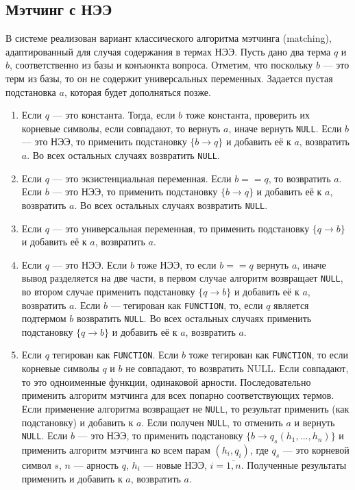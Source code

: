 \subsection{Мэтчинг с НЭЭ}

В системе реализован вариант классического алгоритма мэтчинга (matching), адаптированный для случая содержания в термах НЭЭ. Пусть дано два терма $q$ и $b$, соответственно из базы и конъюнкта вопроса. Отметим, что поскольку $b$ --- это терм из базы, то он не содержит универсальных переменных. Задается пустая подстановка $a$, которая будет дополняться позже.
\begin{enumerate}
\item Если $q$ --- это константа. Тогда, если $b$ тоже константа, проверить их корневые символы, если совпадают, то вернуть $a$, иначе вернуть \texttt{NULL}. Если $b$ --- это НЭЭ, то применить подстановку $\{b \rightarrow q\}$ и добавить её к $a$, возвратить $a$. Во всех остальных случаях возвратить \texttt{NULL}.

\item Если $q$ --- это экзистенциальная переменная. Если $b==q$, то возвратить $a$. Если $b$ --- это НЭЭ, то применить подстановку $\{b \rightarrow q\}$ и добавить её к $a$, возвратить $a$. Во всех остальных случаях возвратить \texttt{NULL}.

\item Если $q$ --- это универсальная переменная, то применить подстановку $\{q \rightarrow b\}$ и добавить её к $a$, возвратить $a$.

\item Если $q$ --- это НЭЭ. Если $b$ тоже НЭЭ, то если $b==q$ вернуть $a$, иначе вывод разделяется на две части, в первом случае алгоритм возвращает \texttt{NULL}, во втором случае применить подстановку $\{q \rightarrow b\}$ и добавить её к $a$, возвратить $a$. Если $b$ --- тегирован как \texttt{FUNCTION}, то, если $q$ является подтермом $b$ возвратить \texttt{NULL}. Во всех остальных случаях применить подстановку $\{q \rightarrow b\}$ и добавить её к $a$, возвратить $a$.

\item Если $q$ тегирован как \texttt{FUNCTION}. Если $b$ тоже тегирован как \texttt{FUNCTION}, то если корневые символы $q$ и $b$ не совпадают, то возвратить NULL. Если совпадают, то это одноименные функции, одинаковой арности. Последовательно применить алгоритм мэтчинга для всех попарно соответствующих термов. Если применение алгоритма возвращает не \texttt{NULL}, то результат применить (как подстановку) и добавить к $a$. Если получен \texttt{NULL}, то отменить $a$ и вернуть \texttt{NULL}. Если $b$ --- это НЭЭ, то применить подстановку $\{b \rightarrow q_s(h_1,...,h_n)\}$ и применить алгоритм мэтчинга ко всем парам $(h_i, q_i)$, где $q_s$ --- это корневой символ $s$, $n$ --- арность $q$, $h_i$ --- новые НЭЭ, $i = \bar{1,n}$. Полученные результаты применить и добавить к  $a$, возвратить $a$.
\end{enumerate}





